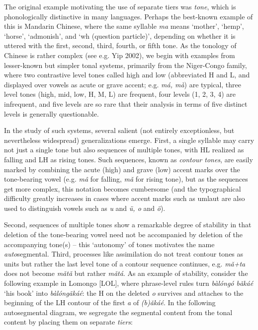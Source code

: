 \smallskip\noindent The original example motivating the use of separate tiers
was {\it tone}, which is phonologically distinctive in many languages. Perhaps
the best-known example of this is Mandarin Chinese, where the same syllable
{\it ma} means `mother', `hemp', `horse', `admonish', and `wh (question
particle)', depending on whether it is uttered with the first, second, third,
fourth, or fifth tone.   As the tonology of Chinese
is rather complex (see e.g. Yip 2002), \nocite{Yip:2002} we begin with
examples from lesser-known but simpler tonal systems, primarily from the
Niger-Congo family, where two contrastive level tones called high and low
(abbreviated H and L, and displayed over vowels as acute or grave accent;
e.g. {\it m\'{a}, m\`{a}}) are typical, three level tones (high, mid, low, H,
M, L) are frequent, four levels (1, 2, 3, 4) are infrequent, and five levels
are so rare that their analysis in terms of five distinct levels is generally
questionable.  

In the study of such systems, several salient (not entirely exceptionless, but
nevertheless widespread) generalizations emerge. First, a single syllable may
carry not just a single tone but also sequences of multiple tones, with HL
realized as falling and LH as rising tones. Such sequences, known as {\it
  contour tones}, are easily marked by combining the acute
(high) and grave (low) accent marks over the tone-bearing vowel (e.g. {\it
  m\^{a}} for falling, {\it m\v{a}} for rising tone), but as the sequences get
more complex, this notation becomes cumbersome (and the typographical
difficulty greatly increases in cases where accent marks such as umlaut are
also used to distinguish vowels such as {\it u} and {\it \"{u}, o} and {\it
  \"{o}}).

Second, sequences of multiple tones show a remarkable degree of stability in
that deletion of the tone-bearing vowel need not be accompanied by deletion of
the accompanying tone(s) -- this `autonomy' of tones motivates the name {\it
  auto}segmental. Third, processes like assimilation do not treat contour
tones as units but rather the last level tone of a contour sequence continues,
e.g. {\it m\v{a}+ta} does not become {\it m\v{a}t\v{a}} but rather {\it
  m\v{a}t\'{a}}. As an example of stability, consider the following example in
Lomongo [LOL], where phrase-level rules turn {\it
  b\`{a}l\'{o}ng\'{o} b\v{a}k\'{a}\'{e}} `his book' into {\it
  b\`{a}l\'{o}ng\~{a}k\'{a}\'{e}}: the H on the deleted {\it o} survives
and attaches to the beginning of the LH contour of the first {\it a} of {\it
  (b)\v{a}k\'{a}\'{e}}. In the following autosegmental diagram, we segregate
the segmental content from the tonal content by placing them on separate {\it
  tiers}:

